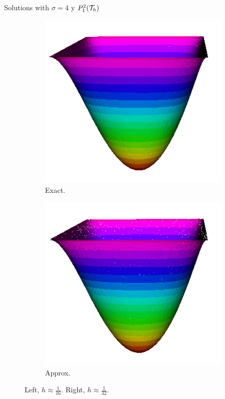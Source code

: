\begin{frame}{Solutions with $\sigma=4$ y $\relax{P}^2_1(\mathcal{T}_h)$}
\begin{figure}[h!]
\begin{subfigure}[b]{0.1\textwidth}
			\end{subfigure}
			\begin{subfigure}[b]{0.2\textwidth}
				\centering
				\includegraphics[scale=0.16]{img/Difusion/Recortes/steady_diffusion_exact_n_32.png}
				\caption{\scriptsize Exact.}
			\end{subfigure}
			\begin{subfigure}[b]{0.2\textwidth}
				\centering
				\includegraphics[scale=0.16]{img/Difusion/Recortes/steady_diffusion_approx_n_32.png}
				\caption{\scriptsize Approx.}
			\end{subfigure}
			\caption{\scriptsize Left, $h\approx\frac{1}{16}$. Right, $h\approx\frac{1}{32}$.}
		\end{figure}
		\end{frame}
		
